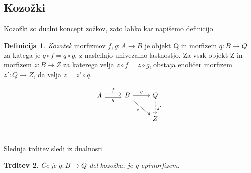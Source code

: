 \documentclass[12pt,a4paper]{book}
\theoremstyle{definition}
\newtheorem{definicija}{Definicija}[chapter]
\theoremstyle{plain}
\newtheorem{trditev}[definicija]{Trditev}
\theoremstyle{definition}
\theoremstyle{remark}
\begin{document}
\subsection{Kozožki}

Kozožki so dualni koncept zožkov, zato lahko kar napišemo definicijo

\begin{definicija}
\textit{Kozožek} morfizmov $f,g:A \to B$ je objekt Q in morfizem $q: B \to Q$ za katega je $q \circ f = q \circ g$, z naslednjo univezalno lastnostjo. Za vsak objekt Z in morfizem $z : B \to Z$ za katerega velja $z \circ f = z \circ g$, obstaja enoličen morfizem $z' : Q \to Z$, da velja $z = z' \circ q$.

$$\begin{tikzcd}
A \ar[r, shift left, "f"] \ar[r, shift right, "g"'] & B \ar[r, "q"] \ar[dr, "z"'] & Q \ar[d, dashed, "z'"] \\
& & Z \\
\end{tikzcd}$$

\end{definicija}

Slednja trditev sledi iz dualnosti.

\begin{trditev}
Če je $q : B \to Q$ del kozožka, je q epimorfizem.
\end{trditev}
\end{document}
